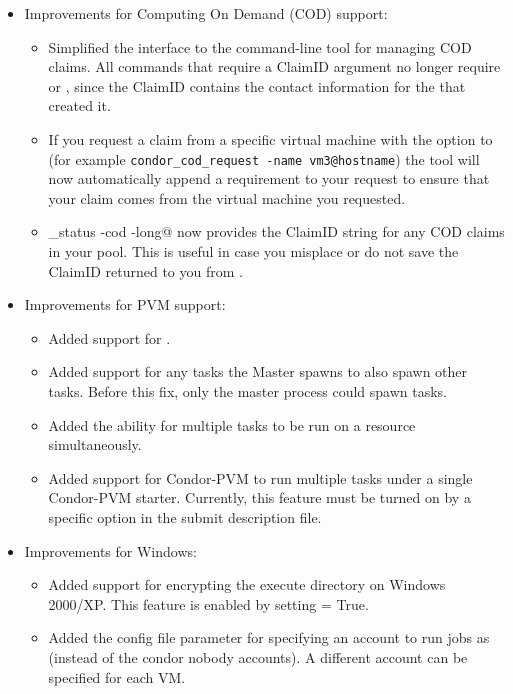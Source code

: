 \begin{itemize}
\item Improvements for Computing On Demand (COD) support: 
  \begin{itemize}
    \item Simplified the interface to the  command-line tool
      for managing COD claims.
      All commands that require a ClaimID argument no longer require
       or , since the ClaimID contains the
      contact information for the  that created it. 
    \item If you request a claim from a specific virtual machine with
      the  option to  (for example
      \verb$condor_cod_request -name vm3@hostname$)
      the tool will now automatically append a requirement to your
      request to ensure that your claim comes from the virtual machine
      you requested.
    \item \verb@condor_status -cod -long@ now provides the ClaimID
      string for any COD claims in your pool. 
      This is useful in case you misplace or do not save the ClaimID
      returned to you from .
  \end{itemize}

\item Improvements for PVM support:
  \begin{itemize}
  \item Added support for .
  \item Added support for any tasks the Master spawns to also spawn other
	tasks. Before this fix, only the master process could spawn tasks.
  \item Added the ability for multiple tasks to be run on a resource
	simultaneously. 
  \item Added support for Condor-PVM to run multiple tasks under a single
	Condor-PVM starter. Currently, this feature must be turned on
	by a specific option in the submit description file.
  \end{itemize}

\item Improvements for Windows:
  \begin{itemize}
  \item Added support for encrypting the execute directory
    on Windows 2000/XP. This feature is enabled by setting
     = True.
  \item Added the  config file parameter for specifying
    an account to run jobs as (instead of the condor nobody accounts). A
    different account can be specified for each VM.
  \end{itemize}


\end{itemize}
